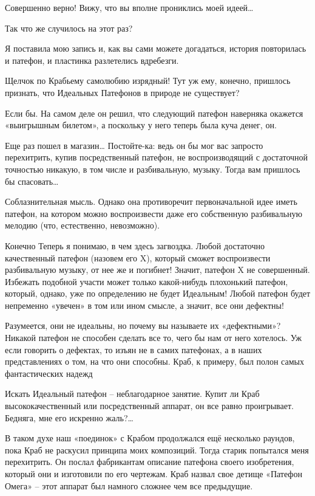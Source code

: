 \documentclass[../main.tex]{subfiles}
\begin{document}
\begin{dialogue}
 Совершенно верно! Вижу, что вы вполне прониклись моей идеей\ldots{}

 Так что же случилось на этот раз?

 Я поставила мою запись и, как вы сами можете догадаться, история повторилась и патефон, и пластинка разлетелись вдребезги.

 Щелчок по Крабьему самолюбию изрядный! Тут уж ему, конечно, пришлось признать, что Идеальных Патефонов в природе не существует?

 Если бы. На самом деле он решил, что следующий патефон наверняка окажется «выигрышным билетом», а поскольку у него теперь была куча денег, он.

 Еще раз пошел в магазин\ldots{} Постойте-ка: ведь он бы мог вас запросто перехитрить, купив посредственный патефон, не воспроизводящий с достаточной точностью никакую, в том числе и разбивальную, музыку. Тогда вам пришлось бы спасовать\ldots{}

 Соблазнительная мысль. Однако она противоречит первоначальной идее иметь патефон, на котором можно воспроизвести даже его собственную разбивальную мелодию (что, естественно, невозможно).

 Конечно Теперь я понимаю, в чем здесь загвоздка. Любой достаточно качественный патефон (назовем его X), который сможет воспроизвести разбивальную музыку, от нее же и погибнет! Значит, патефон X не совершенный. Избежать подобной участи может только какой-нибудь плохонький патефон, который, однако, уже по определению не будет Идеальным! Любой патефон будет непременно «увечен» в том или ином смысле, а значит, все они дефектны!

 Разумеется, они не идеальны, но почему вы называете их «дефектными»? Никакой патефон не способен сделать все то, чего бы нам от него хотелось. Уж если говорить о дефектах, то изъян не в самих патефонах, а в наших представлениях о том, на что они способны. Краб, к примеру, был полон самых фантастических надежд

 Искать Идеальный патефон \--- неблагодарное занятие. Купит ли Краб высококачественный или посредственный аппарат, он все равно проигрывает. Бедняга, мне его искренно жаль?\ldots{}

 В таком духе наш «поединок» с Крабом продолжался ещё несколько раундов, пока Краб не раскусил принципа моих композиций. Тогда старик попытался меня перехитрить. Он послал фабрикантам описание патефона своего изобретения, который они и изготовили по его чертежам. Краб назвал свое детище «Патефон Омега» \--- этот аппарат был намного сложнее чем все предыдущие.


\end{dialogue}
\end{document}
